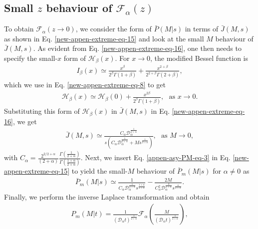 \documentclass[superscriptaddress,amsmath,amssymb,aps,onecolumn]{revtex4}
\begin{document}
\subsection{Small $z$ behaviour of $\mathcal{F}_{\alpha}(z)$}
To obtain $\mathcal{F}_{\alpha} \left(z \to 0 \right)$, we consider the form of $\bar{P}(M|s)$ in terms of $\bar{J}(M,s)$ as shown in Eq. \eqref{new-appen-extreme-eq-15} and look at the small $M$ behaviour of $\bar{J}(M,s)$. As evident from Eq. \eqref{new-appen-extreme-eq-16}, one then needs to specify the  small-$x$ form of $\mathcal{H}_{\beta}(x)$. For $x \to 0$, the modified Bessel function is
\begin{align}
I _{\beta}(x) \simeq \frac{x^{\beta}}{2^{\beta} \Gamma(1+\beta)} + \frac{x^{2+\beta}}{2^{2+\beta}\Gamma(2+\beta)},
\label{appen-asy-PM-eq-1}
\end{align}
which we use in Eq. \eqref{new-appen-extreme-eq-8} to get
\begin{align}
\mathcal{H}_{\beta}(x) \simeq \mathcal{H}_{\beta} (0) +\frac{x^{2 \beta}}{2^{\beta} \Gamma(1+\beta)},~~~\text{as } x \to 0.
\label{appen-asy-PM-eq-2}
\end{align}
Substituting this form of $\mathcal{H}_{\beta}(x)$ in $\bar{J}(M,s)$ in Eq. \eqref{new-appen-extreme-eq-16}, we get 
\begin{align}
\bar{J}(M,s) \simeq \frac{C_{\alpha} \mathcal{D}_{\alpha} ^{\frac{1}{2+\alpha}}}{s \left( C_{\alpha} \mathcal{D}_{\alpha} ^{\frac{1}{2+\alpha}} +M s^{\frac{1}{2+\alpha}}\right)},~~~\text{as }M \to 0,
\label{appen-asy-PM-eq-3}
\end{align}
with $C_{\alpha} = \frac{2^{2/2+\alpha}}{(2+\alpha)} \frac{\Gamma \left( \frac{1}{2+\alpha}\right)}{\Gamma \left( \frac{1+\alpha}{2+\alpha}\right)}$. Next, we insert Eq. \eqref{appen-asy-PM-eq-3} in Eq. \eqref{new-appen-extreme-eq-15} to yield the small-$M$ behaviour of $\bar{P}_m(M|s)$ for $\alpha \neq 0$ as
\begin{align}
\bar{P}_m(M|s) \simeq \frac{1}{C_{\alpha}  \mathcal{D}_{\alpha} ^{\frac{1}{2+\alpha}} s^{\frac{1+\alpha}{2+\alpha}}}-\frac{2M}{C_{\alpha}^2  \mathcal{D}_{\alpha} ^{\frac{2}{2+\alpha}} s^{\frac{\alpha}{2+\alpha}}}.
\label{appen-asy-PM-eq-5}
\end{align}
Finally, we perform the inverse Laplace tramsformation and obtain
\begin{align}
P_m(M|t) = \frac{1}{\left( \mathcal{D}_{\alpha} t\right)^{\frac{1}{2+\alpha}}} \mathcal{F}_{\alpha} \left( \frac{M}{\left( \mathcal{D}_{\alpha} t\right)^{\frac{1}{2+\alpha}}} \right),
\label{appen-asy-PM-eq-6}
\end{align}
\end{document}

